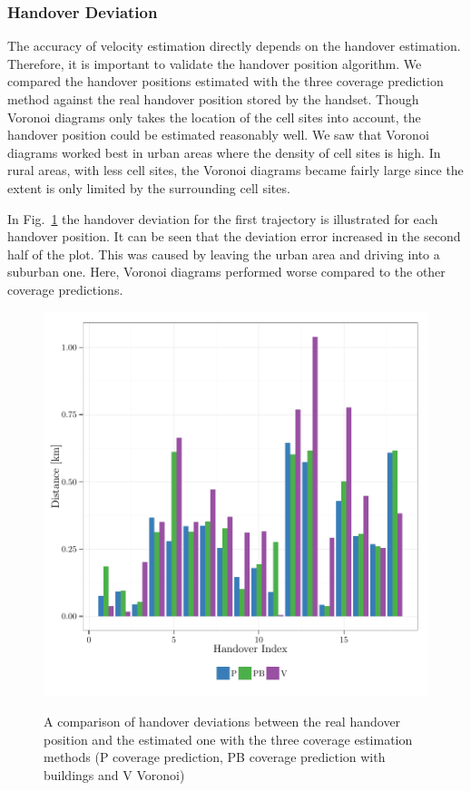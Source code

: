 \subsubsection{Handover Deviation}
The accuracy of velocity estimation directly depends on the handover estimation. Therefore, it is important to validate the handover position algorithm. We compared the handover positions estimated with the three coverage prediction method against the real handover position stored by the handset. Though Voronoi diagrams only takes the location of the cell sites into account, the handover position could be estimated reasonably well. We saw that Voronoi diagrams worked best in urban areas where the density of cell sites is high. In rural areas, with less cell sites, the Voronoi diagrams became fairly large since the extent is only limited by the surrounding cell sites. 

In Fig.~\ref{fig:handoverdeviation} the handover deviation for the first trajectory is illustrated for each handover position. It can be seen that the deviation error increased in the second half of the plot. This was caused by leaving the urban area and driving into a suburban one. Here, Voronoi diagrams performed worse compared to the other coverage predictions.

\begin{figure}[h!]
	
		\caption{ A comparison of handover deviations between the real handover position and the estimated one with the three coverage estimation methods (P coverage prediction, PB coverage prediction with buildings and V Voronoi)
		}
		\includegraphics[width=0.9\columnwidth]{images/563_HandoverDeviation}
			\label{fig:handoverdeviation}
\end{figure}

